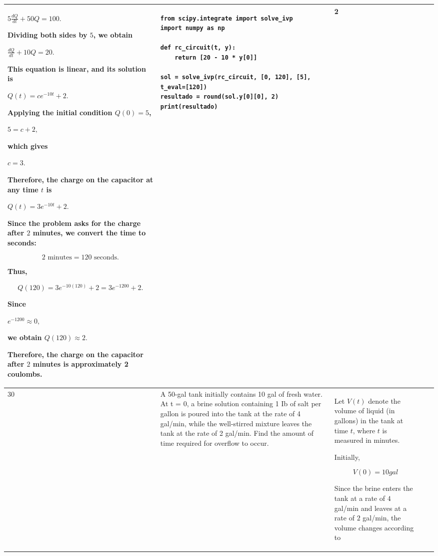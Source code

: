 \documentclass[a4paper,12pt]{article}
\begin{document}
\begin{longtable}{|p{0.3cm}|p{}|p{10cm}|p{}|p{1.5cm}|}
$
5\frac{dQ}{dt}+50Q=100.
$

Dividing both sides by \(5\), we obtain

$
\frac{dQ}{dt}+10Q=20.
$

This equation is linear, and its solution is

$
Q(t)=ce^{-10t}+2.
$

Applying the initial condition \(Q(0)=5\),

$
5=c+2,
$

which gives

$
c=3.
$

Therefore, the charge on the capacitor at any time \(t\) is

$
Q(t)=3e^{-10t}+2.
$

Since the problem asks for the charge after \(2\) minutes, we convert the time to seconds:

$$
2\text{ minutes}=120\text{ seconds}.
$$

Thus,

$$
Q(120)=3e^{-10(120)}+2
=3e^{-1200}+2.
$$

Since

$
e^{-1200}\approx 0,
$

we obtain $
Q(120)\approx 2.
$

Therefore, the charge on the capacitor after \(2\) minutes is approximately 2 coulombs.

 &\begin{verbatim}from scipy.integrate import solve_ivp
import numpy as np

def rc_circuit(t, y):
    return [20 - 10 * y[0]]

sol = solve_ivp(rc_circuit, [0, 120], [5], t_eval=[120])
resultado = round(sol.y[0][0], 2)
print(resultado)\end{verbatim}& 2  \\ \hline 
 30          & 
A 50-gal tank initially contains 10 gal of fresh water. At t = 0, a brine solution containing 1 Ib of salt per gallon is poured into the tank at the rate of 4 gal/min, while the well-stirred mixture leaves the tank at the rate of 2 gal/min. Find the amount of time required for overflow to occur.
                &Let \(V(t)\) denote the volume of liquid (in gallons) in the tank at time \(t\), where \(t\) is measured in minutes.

Initially,

\[
V(0)=10  gal
\]

Since the brine enters the tank at a rate of \(4\) gal/min and leaves at a rate of \(2\) gal/min, the volume changes according to


\end{longtable}
\end{document}
